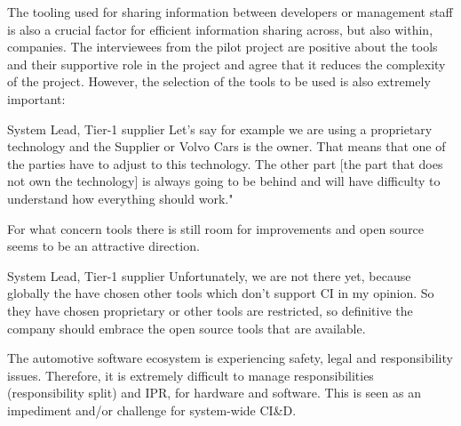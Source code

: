  The tooling used for sharing information between developers or management staff is also a crucial factor for efficient information sharing across, but also within, companies. The interviewees from the pilot project are positive about the tools and their supportive role in the project and agree that it reduces the complexity of the project. However, the selection of the tools to be used is also extremely important:

\begin{aquote}{System Lead, Tier-1 supplier}
Let's say for example we are using a proprietary technology and the Supplier or Volvo Cars is the owner. That means that one of the parties have to adjust to this technology. The other part [the part that does not own the technology] is always going to be behind and will have difficulty to understand how everything should work."
\end{aquote} 

For what concern tools there is still room for improvements and open source seems to be an attractive direction.

\begin{aquote}{System Lead, Tier-1 supplier}
Unfortunately, we are not there yet, because globally the have chosen other tools which don't support CI in my opinion. So they have chosen proprietary or other tools are restricted, so definitive the company should embrace the open source tools that are available.
\end{aquote}

%
%
%
%

 The automotive software ecosystem is experiencing safety, legal and responsibility issues. Therefore, it is extremely difficult to manage responsibilities (responsibility split) and IPR, for hardware and software. This is seen as an impediment and/or challenge for system-wide CI\&D.

